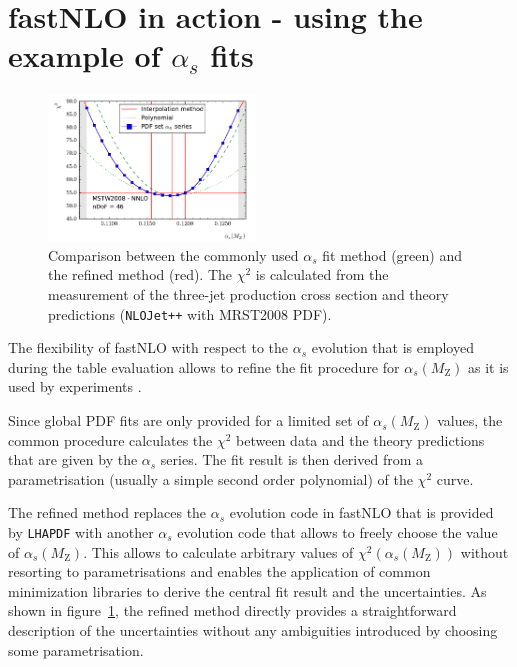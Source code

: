 \documentclass{PoS}
\begin{document}
\section{fastNLO in action - using the example of $\alpha_s$ fits}

\begin{figure}
  \centering
  \includegraphics[width=0.49\textwidth]{chi2cmp}
  \caption{Comparison between the commonly used $\alpha_s$ fit method (green)
  and the refined method (red). The $\chi^2$ is calculated from the measurement
  of the three-jet production cross section\cite{CMS:2014mna} and theory predictions (\texttt{NLOJet++} with MRST2008 PDF\cite{Martin:2009iq}).
  }
  \label{Fig:chi2}
\end{figure}
The flexibility of fastNLO with respect to the $\alpha_s$ evolution
that is employed during the table evaluation allows to refine the
fit procedure for $\alpha_s(M_\mathrm{Z})$ as it is used by
experiments\cite{Affolder:2001hn,Chatrchyan:2013txa}
.%

Since global PDF fits are only provided for a limited set of
$\alpha_s(M_\mathrm{Z})$ values, the common procedure calculates the
$\chi^2$ between data and the theory predictions
that are given by the $\alpha_s$ series.
The fit result is then derived from a parametrisation (usually
a simple second order polynomial) of the $\chi^2$ curve.

The refined method replaces the
$\alpha_s$ evolution code in fastNLO that is provided by \texttt{LHAPDF} with
another $\alpha_s$ evolution code\cite{GRV} that allows to freely
choose the value of $\alpha_s(M_\mathrm{Z})$. This allows to calculate
arbitrary values of $\chi^2(\alpha_s(M_\mathrm{Z}))$ without resorting
to parametrisations and enables the application of common
minimization libraries to derive the central fit result and the
uncertainties.
As shown in figure~\ref{Fig:chi2}, the refined method directly provides
a straightforward description of the uncertainties without any ambiguities
introduced by choosing some parametrisation.




\end{document}
